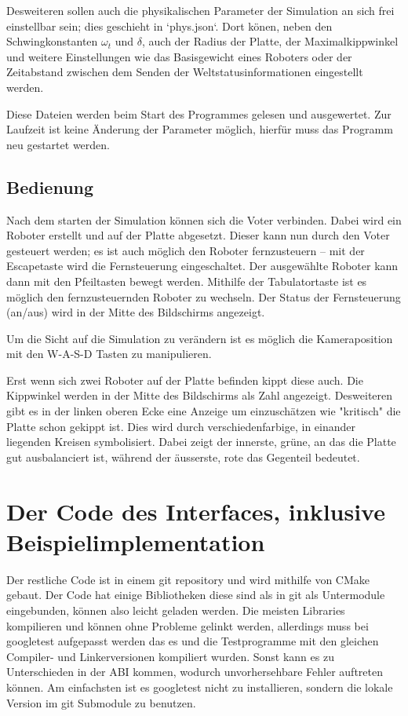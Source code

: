 \documentclass[
    12pt,
    bibliography=totoc,
    ngerman,
    enabledeprecatedfontcommands
]{scrartcl}
\begin{document}
Desweiteren sollen auch die physikalischen Parameter der Simulation an sich frei einstellbar sein; dies geschieht in `phys.json`. Dort k{\"{o}}nen, neben den Schwingkonstanten
$\omega_t$ und $\delta$, auch der Radius der Platte, der Maximalkippwinkel und weitere Einstellungen wie das Basisgewicht eines Roboters oder der Zeitabstand zwischen dem
Senden der Weltstatusinformationen eingestellt werden.


Diese Dateien werden beim Start des Programmes gelesen und ausgewertet. Zur Laufzeit ist keine {\"{A}}nderung der Parameter m{\"{o}}glich, hierf{\"{u}}r muss das Programm
neu gestartet werden.

\subsection{Bedienung}
Nach dem starten der Simulation k{\"{o}}nnen sich die Voter verbinden. Dabei wird ein Roboter erstellt und auf der Platte abgesetzt. Dieser kann nun durch den Voter
gesteuert werden; es ist auch m{\"{o}}glich den Roboter fernzusteuern -- mit der Escapetaste wird die Fernsteuerung eingeschaltet. Der ausgew{\"{a}}hlte Roboter kann
dann mit den Pfeiltasten bewegt werden. Mithilfe der Tabulatortaste ist es m{\"{o}}glich den fernzusteuernden Roboter zu wechseln. Der Status der Fernsteuerung (an/aus)
wird in der Mitte des Bildschirms angezeigt.

Um die Sicht auf die Simulation zu ver{\"{a}}ndern ist es m{\"{o}}glich die Kameraposition mit den W-A-S-D Tasten zu manipulieren.

Erst wenn sich zwei Roboter auf der Platte befinden kippt diese auch. Die Kippwinkel werden in der Mitte des Bildschirms als Zahl angezeigt. Desweiteren gibt es in der
linken oberen Ecke eine Anzeige um einzusch{\"{a}}tzen wie "kritisch" die Platte schon gekippt ist. Dies wird durch verschiedenfarbige, in einander liegenden Kreisen
symbolisiert. Dabei zeigt der innerste, gr{\"{u}}ne, an das die Platte gut ausbalanciert ist, w{\"{a}}hrend der {\"{a}}usserste, rote das Gegenteil bedeutet.


\section{Der Code des Interfaces, inklusive Beispielimplementation}
Der restliche Code ist in einem git repository und wird mithilfe von CMake gebaut. Der Code hat einige Bibliotheken
diese sind als in git als Untermodule eingebunden, k{\"{o}}nnen also leicht geladen werden.
Die meisten Libraries kompilieren und k{\"{o}}nnen ohne Probleme gelinkt werden, allerdings muss bei googletest aufgepasst werden das es und die Testprogramme mit den
gleichen Compiler- und Linkerversionen kompiliert wurden. Sonst kann es zu Unterschieden in der ABI kommen, wodurch unvorhersehbare Fehler auftreten k{\"{o}}nnen. Am einfachsten
ist es googletest nicht zu installieren, sondern die lokale Version im git Submodule zu benutzen.
\end{document}
